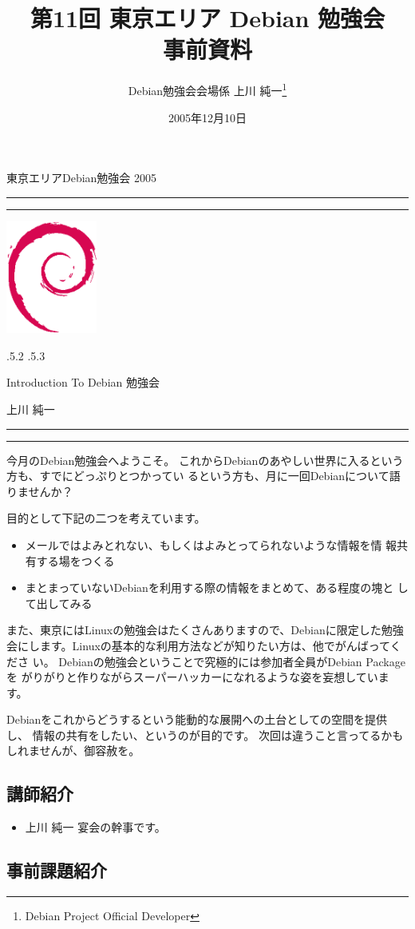 \documentclass[mingoth,a4paper]{jsarticle}
\makeatletter
\renewcommand{\section}{\@startsection{section}{1}{\z@}%
    {\Cvs \@plus.5\Cdp \@minus.2\Cdp}%
    {.5\Cvs \@plus.3\Cdp}%
    {\normalfont\Large\headfont\raggedright\centering}} %
\newcommand{\dancersection}[2]{%
\newpage
東京エリアDebian勉強会 2005
\hrule
\vspace{0.5mm}
\hrule
\hfill{}\includegraphics[width=3cm]{image200502/openlogo-nd.eps}\\
\vspace{-4cm}
\begin{center}
  \section{#1}
\end{center}
\hfill{}#2\hspace{3cm}\space\\
\hrule
\hrule
\vspace{1cm}
}
\makeatother
\begin{document}
\begin{titlepage}

\title{
 第11回 東京エリア Debian 勉強会\\事前資料}
\date{2005年12月10日}
\author{Debian勉強会会場係 上川 純一\thanks{Debian Project Official Developer}} 
\maketitle
\thispagestyle{empty}
\end{titlepage}

\newpage
\tableofcontents

\dancersection{Introduction To Debian 勉強会}{上川 純一}

今月のDebian勉強会へようこそ。
これからDebianのあやしい世界に入るという方も、すでにどっぷりとつかってい
るという方も、月に一回Debianについて語りませんか？

目的として下記の二つを考えています。

\begin{itemize}
 \item メールではよみとれない、もしくはよみとってられないような情報を情
       報共有する場をつくる
 \item まとまっていないDebianを利用する際の情報をまとめて、ある程度の塊と
       して出してみる
\end{itemize}

また、東京にはLinuxの勉強会はたくさんありますので、Debianに限定した勉強
会にします。Linuxの基本的な利用方法などが知りたい方は、他でがんばってくださ
い。
Debianの勉強会ということで究極的には参加者全員がDebian Packageを
がりがりと作りながらスーパーハッカーになれるような姿を妄想しています。

Debianをこれからどうするという能動的な展開への土台としての空間を提供し、
情報の共有をしたい、というのが目的です。
次回は違うこと言ってるかもしれませんが、御容赦を。

\subsection{講師紹介}

\begin{itemize}
 \item{上川 純一} 宴会の幹事です。
\end{itemize}

\subsection{事前課題紹介}
\end{document}
